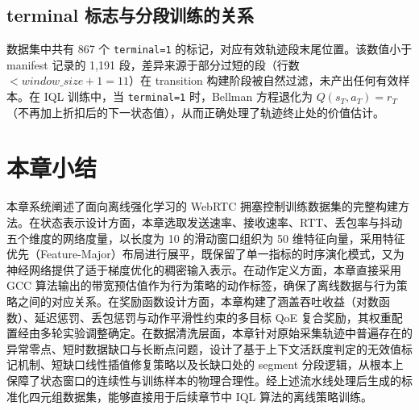 \subsection{terminal 标志与分段训练的关系}

数据集中共有 867 个 \texttt{terminal=1} 的标记，对应有效轨迹段末尾位置。该数值小于 manifest 记录的 1,191 段，差异来源于部分过短的段（行数 $< window\_size + 1 = 11$）在 transition 构建阶段被自然过滤，未产出任何有效样本。在 IQL 训练中，当 \texttt{terminal=1} 时，Bellman 方程退化为 $Q(s_T, a_T) = r_T$（不再加上折扣后的下一状态值），从而正确处理了轨迹终止处的价值估计。

\section{本章小结}

本章系统阐述了面向离线强化学习的 WebRTC 拥塞控制训练数据集的完整构建方法。在状态表示设计方面，本章选取发送速率、接收速率、RTT、丢包率与抖动五个维度的网络度量，以长度为 10 的滑动窗口组织为 50 维特征向量，采用特征优先（Feature-Major）布局进行展平，既保留了单一指标的时序演化模式，又为神经网络提供了适于梯度优化的稠密输入表示。在动作定义方面，本章直接采用 GCC 算法输出的带宽预估值作为行为策略的动作标签，确保了离线数据与行为策略之间的对应关系。在奖励函数设计方面，本章构建了涵盖吞吐收益（对数函数）、延迟惩罚、丢包惩罚与动作平滑性约束的多目标 QoE 复合奖励，其权重配置经由多轮实验调整确定。在数据清洗层面，本章针对原始采集轨迹中普遍存在的异常零点、短时数据缺口与长断点问题，设计了基于上下文活跃度判定的无效值标记机制、短缺口线性插值修复策略以及长缺口处的 segment 分段逻辑，从根本上保障了状态窗口的连续性与训练样本的物理合理性。经上述流水线处理后生成的标准化四元组数据集，能够直接用于后续章节中 IQL 算法的离线策略训练。